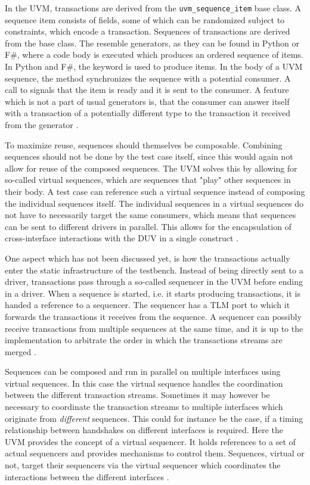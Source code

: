 In the UVM, transactions are derived from the \texttt{uvm\_sequence\_item} base class. A sequence item consists of
fields, some of which can be randomized subject to constraints, which encode a transaction. Sequences of transactions
are derived from the  base class. The resemble generators, as they can be found in Python or F\#,
where a code body is executed which produces an ordered sequence of items. In Python and F\#, the  keyword
is used to produce items. In the body of a UVM sequence, the  method synchronizes the sequence with
a potential consumer. A call to  signals that the item is ready and it is sent to the consumer. A
feature which is not a part of usual generators is, that the consumer can answer itself with a transaction of a
potentially different type to the transaction it received from the generator \cite[Ch. 4.3]{mehta2018asic}.

To maximize reuse, sequences should themselves be composable. Combining sequences should not be done by the test case
itself, since this would again not allow for reuse of the composed sequences. The UVM solves this by allowing for
so-called virtual sequences, which are sequences that "play" other sequences in their body. A test case can reference
such a virtual sequence instead of composing the individual sequences itself. The individual sequences in a virtual
sequences do not have to necessarily target the same consumers, which means that sequences can be sent to different
drivers in parallel. This allows for the encapsulation of cross-interface interactions with the DUV in a single
construct \cite[Ch. 23]{salemi2013uvm}.

One aspect which has not been discussed yet, is how the transactions actually enter the static infrastructure of the
testbench. Instead of being directly sent to a driver, transactions pass through a so-called sequencer in the UVM
before ending in a driver. When a sequence is started, i.e. it starts producing transactions, it is handed a
reference to a sequencer. The sequencer has a TLM port to which it forwards the transactions it receives from the
sequence. A sequencer can possibly receive transactions from multiple sequences at the same time, and it is up to the
implementation to arbitrate the order in which the transactions streams are merged \cite[Ch. 23]{salemi2013uvm}.

Sequences can be composed and run in parallel on multiple interfaces using virtual sequences. In this case the
virtual sequence handles the coordination between the different transaction streams. Sometimes it may however be
necessary to coordinate the transaction streams to multiple interfaces which originate from \textit{different}
sequences. This could for instance be the case, if a timing relationship between handshakes on different interfaces
is required. Here the UVM provides the concept of a virtual sequencer. It holds references to a set of actual
sequencers and provides mechanisms to control them. Sequences, virtual or not, target their sequencers via the
virtual sequencer which coordinates the interactions between the different interfaces \cite{virtualseq}.

